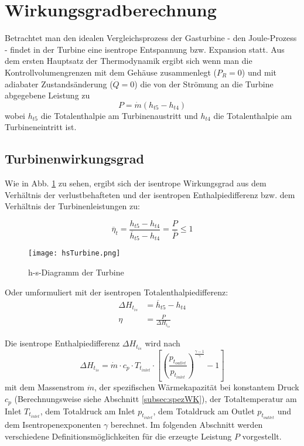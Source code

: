 \section{Wirkungsgradberechnung}
\label{sec:wgberechnung}
Betrachtet man den idealen Vergleichsprozess der Gasturbine - den Joule-Prozess - findet in der Turbine eine isentrope Entspannung bzw. Expansion statt. Aus dem ersten Hauptsatz der Thermodynamik ergibt sich wenn man die Kontrollvolumengrenzen mit dem Gehäuse zusammenlegt  ($P_R = 0$) und mit adiabater Zustandsänderung ($\dot Q = 0$) die von der Strömung an die Turbine abgegebene Leistung zu
\begin{equation}
\label{eq:leistungTurbine}
P = \dot m (h_{t5} - h_{t4})
\end{equation}
wobei $h_{t5}$ die Totalenthalpie am Turbinenaustritt und $h_{t4}$ die Totalenthalpie am Turbineneintritt ist. 



\subsection{Turbinenwirkungsgrad}

Wie in Abb. \ref{fig:hsTurbine} zu sehen, ergibt sich der isentrope Wirkungsgrad aus dem Verhältnis der verlustbehafteten und der isentropen Enthalpiedifferenz bzw. dem Verhältnis der Turbinenleistungen zu:

\begin{equation}
\label{eq:leistungTurbine}
\overline{\eta}_{t} = \frac{h_{t5} - h_{t4}}{\overline{h}_{t5} - h_{t4}} =  \frac{P}{ \overline{P}} \leq 1 
\end{equation}

\begin{figure}[htbp]
	\centering
	\texttt{[image: hsTurbine.png]}
	\caption{h-s-Diagramm der Turbine \cite[p. 42]{GLR-Skript}} \label{fig:hsTurbine}
	
\end{figure} 

Oder umformuliert mit der isentropen Totalenthalpiedifferenz:
\begin{align}
\Delta H_{t_{is}} &= \overline{h}_{t5} - h_{t4}\\
\label{eq:wgallgemein}
\eta &=\frac{P}{\Delta H_{t_{is}}}
\end{align}

Die isentrope Enthalpiedifferenz $\Delta H_{t_{is}}$ wird nach
\begin{equation}
\label{eq:wgnenner}
\Delta H_{t_{is}} = \dot m \cdot c_p \cdot T_{t_{inlet}} \cdot \left[ \left( \frac{p_{t_{outlet}}}{p_{t_{inlet}}}\right)^\frac{\gamma-1}{\gamma}-1\right]
\end{equation}
mit dem Massenstrom $\dot m$, der spezifischen Wärmekapazität bei konstantem Druck $c_p$ (Berechnungsweise siehe Abschnitt \ref{subsec:spezWK}), der Totaltemperatur am Inlet $T_{t_{inlet}}$, dem Totaldruck am Inlet $p_{t_{inlet}}$, dem Totaldruck am Outlet $p_{t_{outlet}}$ und dem Isentropenexponenten $\gamma$ berechnet.\newline 
Im folgenden Abschnitt werden verschiedene Definitionsmöglichkeiten für die erzeugte Leistung $P$ vorgestellt.
